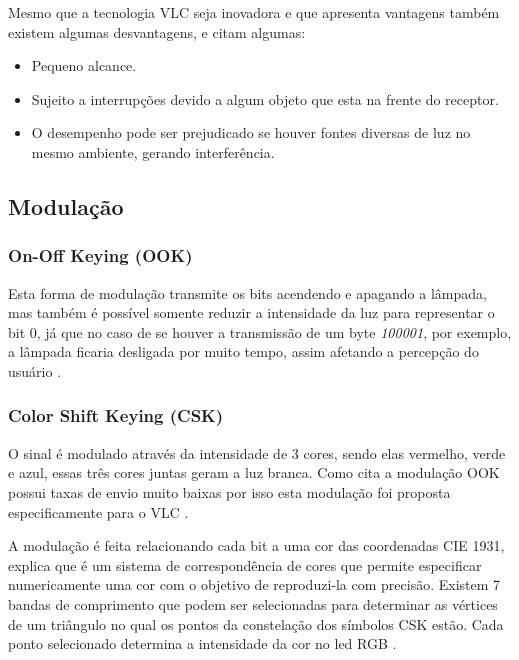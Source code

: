 Mesmo que a tecnologia VLC seja inovadora e que apresenta vantagens também existem algumas desvantagens,  e  citam algumas:

\begin{itemize}
  \item Pequeno alcance.
  \item Sujeito a interrupções devido a algum objeto que esta na frente do receptor.
  \item O desempenho pode ser prejudicado se houver fontes diversas de luz no mesmo ambiente, gerando interferência.
\end{itemize}

\subsection{Modulação}

\subsubsection{On-Off Keying (OOK)}

Esta forma de modulação transmite os bits acendendo e apagando a lâmpada, mas também é possível somente reduzir a intensidade da luz para representar o bit 0, já que no caso de se houver a transmissão de um byte \emph{100001}, por exemplo, a lâmpada ficaria desligada por muito tempo, assim afetando a percepção do usuário \cite{matheus2017comunicaccao}.

\subsubsection{Color Shift Keying (CSK)}

O sinal é modulado através da intensidade de 3 cores, sendo elas vermelho, verde e azul, essas três cores juntas geram a luz branca. Como cita  a modulação OOK possui taxas de envio muito baixas por isso esta modulação foi proposta especificamente para o VLC \cite{matheus2017comunicaccao}. 

A modulação é feita relacionando cada bit a uma cor das coordenadas CIE 1931,  explica que é um sistema de correspondência de cores que permite especificar numericamente uma cor com o objetivo de reproduzi-la com precisão. Existem 7 bandas de comprimento que podem ser selecionadas para determinar as vértices de um triângulo no qual os pontos da constelação dos símbolos CSK estão. Cada ponto selecionado determina a intensidade da cor no led RGB \cite{matheus2017comunicaccao}.

